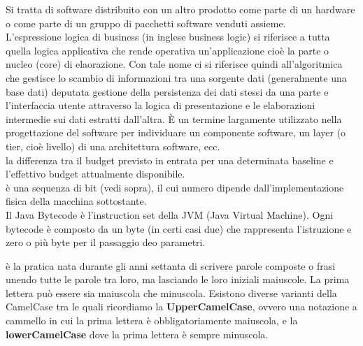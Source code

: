 \documentclass{scalatekids-article}
\begin{document}
 Si tratta di software distribuito con un altro prodotto come parte di un hardware o come parte di un gruppo di pacchetti software venduti assieme.
\\

 L'espressione logica di business (in inglese business logic) si riferisce a tutta quella logica applicativa che rende operativa un'applicazione cioè la parte o nucleo (core) di elaorazione.
Con tale nome ci si riferisce quindi all'algoritmica che gestisce lo scambio di informazioni tra una sorgente dati (generalmente una base dati) deputata gestione della persistenza dei dati stessi da una parte e l'interfaccia utente attraverso la logica di presentazione e le elaborazioni intermedie sui dati estratti dall'altra.
È un termine largamente utilizzato nella progettazione del software per individuare un componente software, un layer (o tier, cioè livello) di una architettura software, ecc.
\\

 la differenza tra il budget previsto in entrata per una determinata baseline e l'effettivo budget attualmente disponibile.
\\

 è una sequenza di bit (vedi sopra), il cui numero dipende dall'implementazione fisica della macchina sottostante.
\\

 Il Java Bytecode è l'instruction set della JVM (Java Virtual Machine). Ogni bytecode è composto da un byte (in certi casi due) che rappresenta l'istruzione e zero o più byte per il passaggio deo parametri. 
\\


 è la pratica nata durante gli anni settanta di scrivere parole composte o frasi unendo tutte le parole tra loro, ma lasciando le loro iniziali maiuscole. La prima lettera può essere sia maiuscola che minuscola.
Esistono diverse varianti della CamelCase tra le quali ricordiamo la \textbf{UpperCamelCase}, ovvero una notazione a cammello in cui la prima lettera è obbligatoriamente maiuscola, e la \textbf{lowerCamelCase} dove la prima lettera è sempre minuscola.
\\
\end{document}
